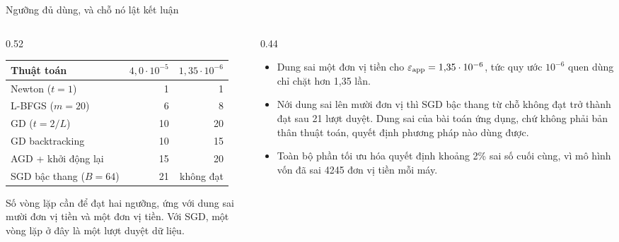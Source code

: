 \documentclass[10pt, aspectratio=169]{beamer}
\begin{document}
\begin{frame}{Ngưỡng đủ dùng, và chỗ nó lật kết luận}
  \begin{columns}[T]
    \begin{column}{0.52\textwidth}
      \small
      \begin{tabular}{lrr}
        \toprule
        Thuật toán
          & $4{,}0 \cdot 10^{-5}$
          & $1{,}35 \cdot 10^{-6}$ \\
        \midrule
        Newton ($t = 1$)         & 1  & 1  \\
        L-BFGS ($m = 20$)        & 6  & 8  \\
        GD ($t = 2/L$)           & 10 & 20 \\
        GD backtracking          & 10 & 15 \\
        AGD + khởi động lại      & 15 & 20 \\
        SGD bậc thang ($B = 64$) & 21 & không đạt \\
        \bottomrule
      \end{tabular}
      \medskip

      Số vòng lặp cần để đạt hai ngưỡng, ứng với dung sai mười đơn vị tiền và
      một đơn vị tiền. Với SGD, một vòng lặp ở đây là một lượt duyệt dữ liệu.
    \end{column}
    \begin{column}{0.44\textwidth}
      \begin{itemize}
        \item Dung sai một đơn vị tiền cho
              $\varepsilon_{\text{app}} = 1{,}35 \cdot 10^{-6}$, tức quy ước $10^{-6}$
              quen dùng chỉ chặt hơn 1,35 lần.
        \item Nới dung sai lên mười đơn vị thì SGD bậc thang từ chỗ không đạt
              trở thành đạt sau 21 lượt duyệt. Dung sai của bài toán ứng dụng,
              chứ không phải bản thân thuật toán, quyết định phương pháp nào
              dùng được.
        \item Toàn bộ phần tối ưu hóa quyết định khoảng 2\% sai số cuối cùng,
              vì mô hình vốn đã sai \num{4245} đơn vị tiền mỗi máy.
      \end{itemize}
    \end{column}
  \end{columns}
\end{frame}
\end{document}

